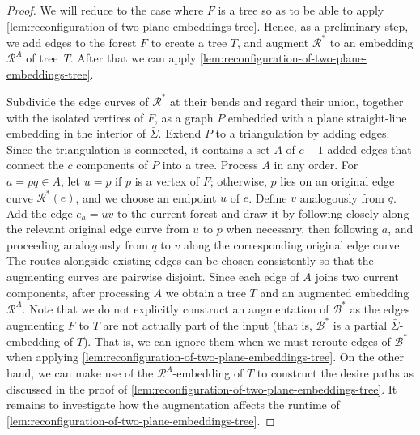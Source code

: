 \documentclass[a4paper,USenglish,cleveref,colorlinks=true,urlcolor=black,linkcolor=black,citecolor=black,thm-restate,authorcolumns]{lipics-v2021}
\theoremstyle{claimstyle}
\begin{document}
\begin{proof}
    We will reduce to the case where $F$ is a tree so as to be able to apply \cref{lem:reconfiguration-of-two-plane-embeddings-tree}.
    Hence, as a preliminary step, we add edges to the forest $F$ to create a tree $T$,
    and augment $\mathcal R^*$ to an embedding ${\mathcal R}^A$ of tree~$T$.
    After that we can apply \cref{lem:reconfiguration-of-two-plane-embeddings-tree}.

    Subdivide the edge curves of $\mathcal R^*$ at their bends and regard their union, together with the isolated vertices of $F$, as a graph $P$ embedded with a plane straight-line embedding in the interior of $\bar\Sigma$.
    Extend $P$ to a triangulation by adding edges.
    Since the triangulation is connected, it contains a set $A$ of $c-1$ added edges that connect the $c$ components of $P$ into a tree.
    Process $A$ in any order.
    For $a=pq\in A$, let $u=p$ if $p$ is a vertex of $F$; otherwise, $p$ lies on an original edge curve $\mathcal R^*(e)$, and we choose an endpoint $u$ of $e$.
    Define $v$ analogously from $q$.
    Add the edge $e_a=uv$ to the current forest and draw it by following closely along the relevant original edge curve from $u$ to $p$ when necessary, then following $a$, and proceeding analogously from $q$ to $v$ along the corresponding original edge curve.
    The routes alongside existing edges can be chosen consistently so that the augmenting curves are pairwise disjoint.
    Since each edge of $A$ joins two current components, after processing $A$ we obtain a tree $T$ and an augmented embedding $\mathcal R^A$.
    Note that we do not explicitly construct an augmentation of $\mathcal{B}^*$ as the edges augmenting $F$ to $T$ are not actually part of the input (that is, $\mathcal{B}^*$ is a partial $\bar\Sigma$-embedding of $T$). That is, we can ignore them when we must reroute edges of $\mathcal{B}^*$ when applying \cref{lem:reconfiguration-of-two-plane-embeddings-tree}.
    On the other hand, we can make use of the $\mathcal{R}^A$-embedding of $T$ to construct the desire paths as discussed in the proof of \cref{lem:reconfiguration-of-two-plane-embeddings-tree}.
    It remains to investigate how the augmentation affects the runtime of \cref{lem:reconfiguration-of-two-plane-embeddings-tree}.




\end{proof}
\end{document}
